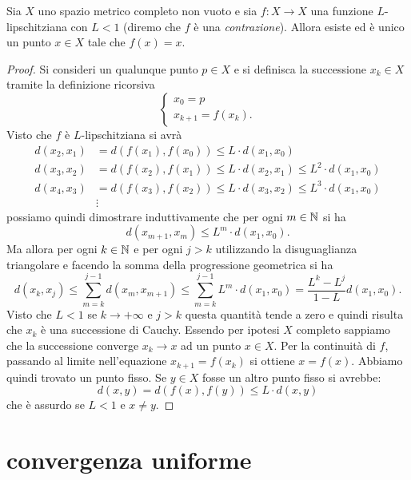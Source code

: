 \begin{theorem}
\mymark{***}%
%
%
%
%
%
%
%
\label{th:banach-caccioppoli}%
Sia $X$ uno spazio metrico completo non vuoto e sia $f\colon X \to X$ una funzione $L$-lipschitziana con $L<1$ (diremo che $f$ è una \emph{contrazione}).
Allora esiste ed è unico un punto
$x\in X$ tale che $f(x) = x$.
\end{theorem}
%
\begin{proof}
\mymark{***}
Si consideri un qualunque punto $p \in X$ e si definisca
la successione $x_k\in X$ tramite la definizione ricorsiva
\[
\begin{cases}
  x_0 = p \\
  x_{k+1} = f(x_k).
\end{cases}
\]
Visto che $f$ è $L$-lipschitziana si avrà
\begin{align*}
  d(x_2, x_1) &= d(f(x_1),f(x_0)) \le L \cdot d(x_1,x_0) \\
  d(x_3, x_2) &= d(f(x_2),f(x_1)) \le L \cdot d(x_2,x_1)
  \le L^2 \cdot d(x_1, x_0) \\
  d(x_4, x_3) &= d(f(x_3),f(x_2)) \le L \cdot d(x_3,x_2)
  \le L^3 \cdot d(x_1, x_0) \\
  &\vdots
\end{align*}
possiamo quindi dimostrare induttivamente che
per ogni $m\in {\mathbb N}$ si ha
\[
  d(x_{m+1}, x_m) \le L^m \cdot d(x_1, x_0).
\]
Ma allora per ogni $k\in {\mathbb N}$ e per ogni $j>k$
utilizzando la disuguaglianza triangolare e facendo la somma della progressione geometrica
si ha
\[
  d(x_k,x_j) \le \sum_{m=k}^{j-1} d(x_m, x_{m+1})
   \le \sum_{m=k}^{j-1} L^m \cdot d(x_1, x_0)
   = \frac{L^k-L^j}{1-L} d(x_1,x_0).
\]
Visto che $L<1$ se $k\to +\infty$ e $j>k$ questa quantità tende a zero e quindi
risulta che $x_k$ è una successione di Cauchy. Essendo per ipotesi $X$ completo sappiamo che la successione converge $x_k \to x$ ad un punto $x\in X$.
Per la continuità di $f$, passando al limite nell'equazione
$x_{k+1} = f(x_k)$ si ottiene $x = f(x)$.
Abbiamo quindi trovato un punto fisso.
Se $y\in X$ fosse un altro punto fisso si avrebbe:
\[
  d(x,y) = d(f(x),f(y)) \le L \cdot d(x,y)
\]
che è assurdo se $L<1$ e $x\neq y$.
\end{proof}

\section{convergenza uniforme}

